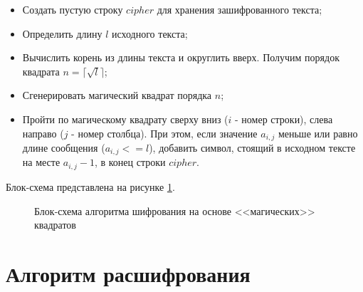 \documentclass[utf8x, 14pt, bold, times]{G7-32} %
\begin{document}
\begin{itemize}
\item Создать пустую строку $cipher$ для хранения зашифрованного текста;
\item Определить длину $l$ исходного текста;
\item Вычислить корень из длины текста и округлить вверх.
      Получим порядок квадрата $n = \lceil \sqrt{l} \rceil$; 
\item Сгенерировать магический квадрат порядка $n$;
\item Пройти по магическому квадрату сверху вниз ($i$ - номер строки),
      слева направо ($j$ - номер столбца). При этом, если значение
      $a_{i,j}$ меньше или равно длине сообщения ($a_{i,j} <= l$),
      добавить символ, стоящий в исходном тексте на месте $a_{i,j}-1$,
      в конец строки $cipher$. 
\end{itemize}

Блок-схема представлена на рисунке \ref{ris:magic-square-encrypt}.

\vspace{\baselineskip}
\begin{figure}[H]
    \caption{Блок-схема алгоритма шифрования на основе <<магических>> квадратов}
\label{ris:magic-square-encrypt}
\end{figure}

\section{Алгоритм расшифрования}
\end{document}

